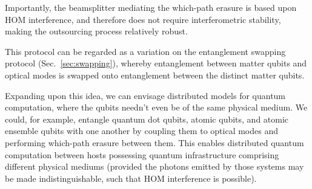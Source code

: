 \documentclass[aps,rmp,twocolumn,amsmath,amssymb,nofootinbib,superscriptaddress,longbibliography,floatfix,table-of-contents,eqsecnum]{revtex4-1}
\begin{document}
Importantly, the beamsplitter mediating the which-path erasure is based upon HOM interference, and therefore does not require interferometric stability, making the outsourcing process relatively robust.

This protocol can be regarded as a variation on the entanglement swapping protocol (Sec.~\ref{sec:swapping}), whereby entanglement between matter qubits and optical modes is swapped onto entanglement between the distinct matter qubits.

Expanding upon this idea, we can envisage distributed models for quantum computation, where the qubits needn't even be of the same physical medium. We could, for example, entangle quantum dot qubits, atomic qubits, and atomic ensemble qubits with one another by coupling them to optical modes and performing which-path erasure between them. This enables distributed quantum computation between hosts possessing quantum infrastructure comprising different physical mediums (provided the photons emitted by those systems may be made indistinguishable, such that HOM interference is possible).
\end{document}
